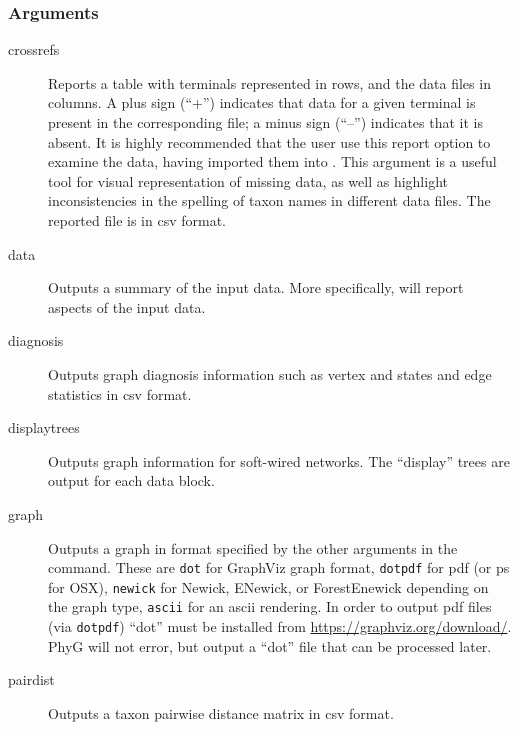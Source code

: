 	\subsubsection{Arguments}
	\begin{description}
		
		\item[crossrefs] Reports a table with terminals represented in rows, and the data files in 
		columns. A plus sign (``+'') indicates that data for a given terminal is present in the 
		corresponding file; a minus sign (``--'') indicates that it is absent. It is highly recommended 
		that the user use this report option to examine the data, having imported them into \phyg. 
		This argument is a useful tool for visual representation of missing data, as well as highlight 
		inconsistencies in the spelling of taxon names in different data files. The reported file is 
		in csv format.
			
		\item[data] Outputs a summary of the input data. More specifically, \phyg will report 
		aspects of the input data. 
	
		\item[diagnosis] Outputs graph diagnosis information such as vertex and states and edge 
		statistics in csv format. 
		
		\item[displaytrees] Outputs graph information for soft-wired networks. The ``display'' trees 
		are output for each data block. 
		
		\item[graph] Outputs a graph in format specified by the other arguments in the command. 
		These are \texttt{dot} for 
		GraphViz graph format, \texttt{dotpdf} for pdf (or ps for OSX), \texttt{newick} for Newick, 
		ENewick, or ForestEnewick depending on the graph type, \texttt{ascii} for an ascii rendering. 
		In order to output pdf files (via \texttt{dotpdf}) ``dot'' must be installed from 
		\url{https://graphviz.org/download/}. PhyG will not error, but output a ``dot'' file that 
		can be processed later.
		
		\item[pairdist] Outputs a taxon pairwise distance matrix in csv format. 
		

\end{description}
